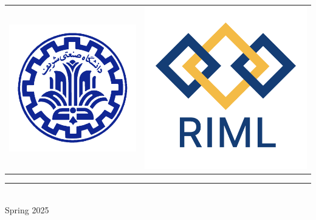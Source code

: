 \documentclass[12pt]{article}
\begin{document}
\begin{center}
{\vspace*{\fill}
\begin{center}
\begin{tabular}{cc}
    \includegraphics[width=0.16\linewidth]{figs/sharif-logo.png} & \includegraphics[width=0.16\linewidth]{figs/riml-logo.png} \\
\end{tabular}
\end{center}

\vspace*{-.25cm}

{\color{YellowOrange} {
\rule{8cm}{0.5pt} \\
\vspace{2pt}
\large Spring 2025}
}}
\vspace*{-1cm}

\end{center}


\newpage
{}
\thispagestyle{plain}
{\selectfont {\color{BrickRed} \textbf{\tableofcontents} }}
\end{document}

